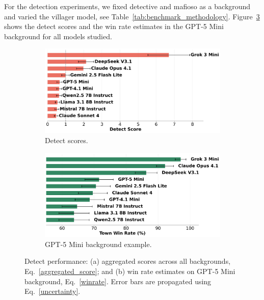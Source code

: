 \documentclass{article}
\begin{document}
For the detection experiments, we fixed detective and mafioso as a background and varied the villager model, see Table~\ref{tab:benchmark_methodology}. Figure~\ref{fig:detect_example} shows the detect scores and the win rate estimates in the GPT-5 Mini background for all models studied.

\begin{figure}[htbp]
    \centering
    \begin{subfigure}[b]{0.48\textwidth}
        \centering
        \includegraphics[width=\textwidth]{../results/scores_detect.png}
        \caption{Detect scores.}
        \label{fig:detect_score}
    \end{subfigure}
    \hfill
    \begin{subfigure}[b]{0.48\textwidth}
        \centering
        \includegraphics[width=\textwidth]{../results/win_rates_detect_gpt-5_mini.png}
        \caption{GPT-5 Mini background example.}
        \label{fig:detect_gpt_example}
    \end{subfigure}
    \caption{Detect performance: (a) aggregated scores across all backgrounds, Eq.~\eqref{aggregated_score}; and (b) win rate estimates on GPT-5 Mini background, Eq.~\eqref{winrate}. Error bars are propagated using Eq.~\eqref{uncertainty}.}
    \label{fig:detect_example}
\end{figure}
\end{document}
